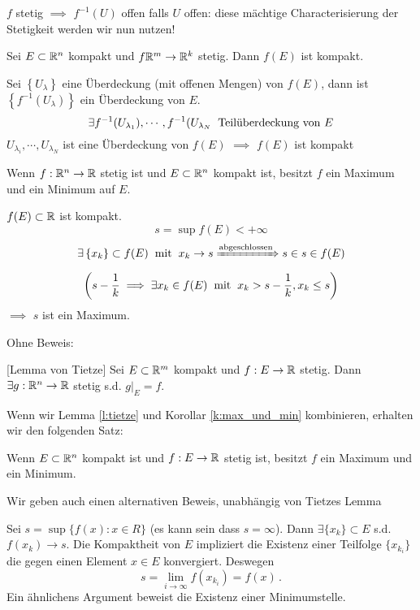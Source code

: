 \begin{Bem}
  $f$ stetig $\implies$ $f^{-1}(U)$ offen falls $U$ offen: diese m\"achtige Characterisierung 
der Stetigkeit werden wir nun nutzen!
\end{Bem}
\begin{Kor} Sei $E\subset \mathbb{R}^n$ kompakt und $f\mathbb{R}^m\rightarrow \mathbb{R}^k$ stetig. 
Dann $f(E)$ ist kompakt.
\end{Kor}
\begin{Bew}
  Sei $\left\{ U_\lambda \right\}$ eine Überdeckung (mit offenen Mengen) von $f(E)$, dann ist $\left\{ f^{-1}\left( U_\lambda \right) \right\}$ ein Überdeckung von $E$.
  \[\exists f^{-1}(U_{\lambda_1}),\cdots,f^{-1}(U_{\lambda_N}\hspace{2mm}\text{Teilüberdeckung von $E$}\]
  $U_{\lambda_i},\cdots,U_{\lambda_N}$ ist eine Überdeckung von $f(E)$ $\implies$ $f(E)$ ist kompakt
\end{Bew}
\begin{Kor}\label{k:max_und_min}
  Wenn $f:\mathbb{R}^n\rightarrow \mathbb{R}$ stetig ist und $E\subset\mathbb{R}^n$ kompakt ist, besitzt $f$ ein Maximum und ein Minimum auf $E$.
\end{Kor}
\begin{Bew}
  $f(E)\subset\mathbb{R}$ ist kompakt.
  \[s=\sup f(E)<+\infty\]
  \[\exists \left\{ x_k \right\}\subset f(E)\hspace{2mm}\text{mit}\hspace{2mm} x_k\rightarrow s\xRightarrow{\text{abgeschlossen}}s\in s\in f(E)\]
  \[\left( s-\frac{1}{k}\implies \exists x_k\in f(E)\hspace{2mm}\text{mit}\hspace{2mm} x_k>s-\frac{1}{k},x_k\leq s \right)\]
  $\implies$ $s$ ist ein Maximum.
\end{Bew}

Ohne Beweis:

\begin{Lem}\label{l:tietze}[Lemma von Tietze]
Sei $E\subset \mathbb{R}^{m}$ kompakt und $f:E\rightarrow \mathbb{R}$ stetig. Dann $\exists g: \mathbb{R}^n\rightarrow
\mathbb{R}$ stetig s.d. $g|_E = f$.
\end{Lem}

Wenn wir Lemma \ref{l:tietze} und Korollar \ref{k:max_und_min} kombinieren, erhalten wir
den folgenden Satz:

\begin{Sat}
 Wenn $E\subset\mathbb{R}^n$ kompakt ist und $f:E\rightarrow \mathbb{R}$ stetig ist, besitzt $f$ ein Maximum und ein Minimum.
\end{Sat}

Wir geben auch einen alternativen Beweis, unabh\"angig von Tietzes Lemma

\begin{Bew}
Sei $s = \sup \{f(x):x\in R\}$ (es kann sein dass $s=\infty$). Dann $\exists \{x_k\}\subset E$
s.d. $f(x_k)\to s$. Die Kompaktheit von $E$ impliziert die Existenz einer Teilfolge
$\{x_{k_i}\}$ die gegen einen Element $x\in E$ konvergiert. Deswegen
\[
s = \lim_{i\to\infty} f(x_{k_i}) = f(x)\, .
\]
Ein \"ahnlichens Argument beweist die Existenz einer Minimumstelle.
\end{Bew}

